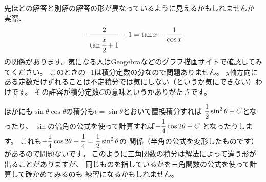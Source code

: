 \documentclass[a4paper]{ltjsarticle}
\begin{document}
\begin{supple*}
  先ほどの解答と別解の解答の形が異なっているように見えるかもしれませんが
  実際、
  \begin{gather*}
    -\frac{2}{{\tan\cfrac{x}{2} + 1}}+1=\tan x - \frac{1}{\cos x}
  \end{gather*}
  の関係があります。気になる人はGeogebraなどのグラフ描画サイトで確認してみてください。
  このときの$+1$は積分定数の分なので問題ありません。
  $y$軸方向にある定数だけずれることは不定積分では気にしない（というか気にできない）わけです。
  その許容が積分定数$C$の意味というかありがたさです。
  \begin{spacing}{1.5}
    ほかにも$\sin\theta\cos\theta$の積分も$t=\sin\theta$とおいて置換積分すれば
    $\displaystyle\frac{1}{2}\sin^2\theta+C$となったり、
    $\sin$の倍角の公式を使って計算すれば$\displaystyle-\frac{1}{4}\cos2\theta+C$
    となったりします。
    これも$\displaystyle -\frac{1}{4}\cos2\theta + \frac{1}{4} = \frac{1}{2}\sin^2\theta$の
    関係（半角の公式を変形したものです）があるので問題ないです。
    このように三角関数の積分は解法によって違う形が出ることがありますが、
    同じものを指しているかを三角関数の公式を使って計算して確かめてみるのも
    練習になるかもしれません。
  \end{spacing}
\end{supple*}

\begin{intprob}
\end{intprob}

\begin{intprob}
\end{intprob}
\end{document}
